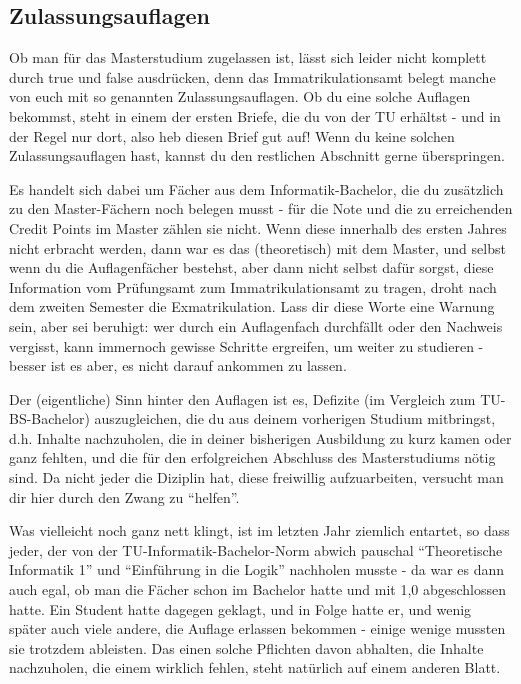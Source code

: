 \begin{multicols}{2}
\label{auflagen}
\subsection{Zulassungsauflagen}
Ob man für das Masterstudium zugelassen ist, lässt sich leider nicht komplett durch true und false ausdrücken, denn das Immatrikulationsamt belegt manche von euch mit so genannten Zulassungsauflagen. Ob du eine solche Auflagen bekommst, steht in einem der ersten Briefe, die du von der TU erhältst - und in der Regel nur dort, also heb diesen Brief gut auf! Wenn du keine solchen Zulassungsauflagen hast, kannst du den restlichen Abschnitt gerne überspringen.

Es handelt sich dabei um Fächer aus dem Informatik-Bachelor, die du zusätzlich zu den Master-Fächern noch belegen musst - für die Note und die zu erreichenden Credit Points im Master zählen sie nicht. Wenn diese innerhalb des ersten Jahres nicht erbracht werden, dann war es das (theoretisch) mit dem Master, und selbst wenn du die Auflagenfächer bestehst, aber dann nicht selbst dafür sorgst, diese Information vom Prüfungsamt zum Immatrikulationsamt zu tragen, droht nach dem zweiten Semester die Exmatrikulation. Lass dir diese Worte eine Warnung sein, aber sei beruhigt: wer durch ein Auflagenfach durchfällt oder den Nachweis vergisst, kann immernoch gewisse Schritte ergreifen, um weiter zu studieren - besser ist es aber, es nicht darauf ankommen zu lassen.

Der (eigentliche) Sinn hinter den Auflagen ist es, Defizite (im Vergleich zum TU-BS-Bachelor) auszugleichen, die du aus deinem vorherigen Studium mitbringst, d.h. Inhalte nachzuholen, die in deiner bisherigen Ausbildung zu kurz kamen oder ganz fehlten, und die für den erfolgreichen Abschluss des Masterstudiums nötig sind. Da nicht jeder die Diziplin hat, diese freiwillig aufzuarbeiten, versucht man dir hier durch den Zwang zu "`helfen"'.

Was vielleicht noch ganz nett klingt, ist im letzten Jahr ziemlich entartet, so dass jeder, der von der TU-Informatik-Bachelor-Norm abwich pauschal "`Theoretische Informatik 1"' und "`Einführung in die Logik"' nachholen musste - da war es dann auch egal, ob man die Fächer schon im Bachelor hatte und mit 1,0 abgeschlossen hatte. Ein Student hatte dagegen geklagt, und in Folge hatte er, und wenig später auch viele andere, die Auflage erlassen bekommen - einige wenige mussten sie trotzdem ableisten. Das einen solche Pflichten davon abhalten, die Inhalte nachzuholen, die einem wirklich fehlen, steht natürlich auf einem anderen Blatt.


\end{multicols}
